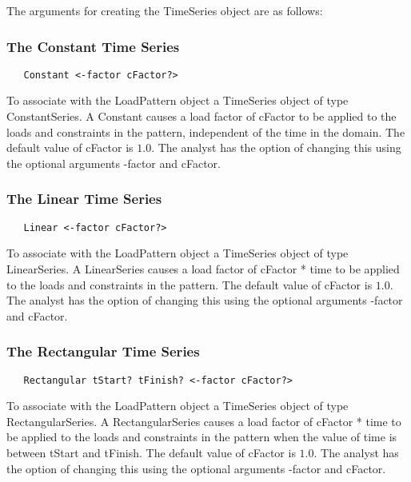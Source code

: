 \documentclass[12pt]{article}
\begin{document}
The arguments for creating the TimeSeries object are as
follows: 

\subsubsection{The Constant Time Series}

{\sf\small
\begin{verbatim}
   Constant <-factor cFactor?> 
\end{verbatim}
}

\noindent To associate with the LoadPattern object a TimeSeries object
of type ConstantSeries. A Constant causes a load factor of cFactor to
be applied to the loads and constraints in the pattern, independent of
the time in the domain. The default value of cFactor is $1.0$. The
analyst has the option of changing this using the optional arguments
-factor and cFactor. 

\subsubsection{The Linear Time Series}

{\sf\small
\begin{verbatim}
   Linear <-factor cFactor?> 
\end{verbatim}
}

\noindent To associate with the LoadPattern object a TimeSeries object
of type LinearSeries. A LinearSeries causes a load factor of cFactor *
time to be applied to the loads and constraints in the pattern. The
default value of cFactor is $1.0$. The analyst has the option of
changing this using the optional arguments -factor and cFactor. 

\subsubsection{The Rectangular Time Series}

{\sf\small
\begin{verbatim}
   Rectangular tStart? tFinish? <-factor cFactor?> 
\end{verbatim}
}

\noindent To associate with the LoadPattern object a TimeSeries object
of type RectangularSeries. A RectangularSeries causes a load factor of
cFactor * time to be applied to the loads and constraints in the
pattern when the value of time is between tStart and tFinish. The
default value of cFactor is $1.0$. The analyst has the option of
changing this using the optional arguments -factor and cFactor. 
\end{document}
